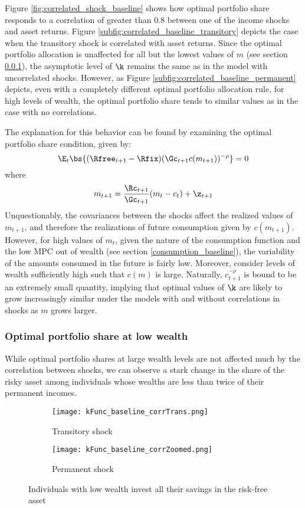 Figure \ref{fig:correlated_shock_baseline} shows how optimal portfolio share responds to a correlation of greater than 0.8 between one of the income shocks and asset returns. Figure \ref{subfig:correlated_baseline_transitory} depicts the case when the transitory shock is correlated with asset returns. Since the optimal portfolio allocation is unaffected for all but the lowest values of $m$ (see section \ref{portfolio_low_wealth}), the asymptotic level of $\k$ remains the same as in the model with uncorrelated shocks. However, as Figure \ref{subfig:correlated_baseline_permanent} depicts, even with a completely different optimal portfolio allocation rule, for high levels of wealth, the optimal portfolio share tends to similar values as in the case with no correlations.

The explanation for this behavior can be found by examining the optimal portfolio share condition, given by:
\[
\E_{t}\bs{(\Rfree_{t+1} - \Rfix)(\Gc_{t+1}c(m_{t+1}))^{-\rho}} = 0
\]
where
\[
m_{t+1} = \frac{\Rc_{t+1}}{\Gc_{t+1}}(m_{t} - c_{t}) + \z_{t+1}
\]
Unquestionably, the covariances between the shocks affect the realized values of $m_{t+1}$, and therefore the realizations of future consumption given by $c(m_{t+1})$. However, for high values of $m_{t}$, given the nature of the consumption function and the low MPC out of wealth (see section \ref{consumption_baseline}), the variability of the amounts consumed in the future is fairly low. Moreover, consider levels of wealth sufficiently high such that $c(m)$ is large. Naturally, $c_{t+1}^{-\rho}$ is bound to be an extremely small quantity, implying that optimal values of $\k$ are likely to grow increasingly similar under the models with and without correlations in shocks as $m$ grows larger.

\subsubsection{Optimal portfolio share at low wealth}\label{portfolio_low_wealth}

While optimal portfolio shares at large wealth levels are not affected much by the correlation between shocks, we can observe a stark change in the share of the risky asset among individuals whose wealths are less than twice of their permanent incomes.

\begin{figure}[h]
    \centering
    \begin{subfigure}{0.49\textwidth}
        \centering
        \texttt{[image: kFunc\_baseline\_corrTrans.png]}
        \caption{Transitory shock}
        \label{subfig:correlated_poor_transitory}        
    \end{subfigure}
    \begin{subfigure}{0.49\textwidth}
        \centering
        \texttt{[image: kFunc\_baseline\_corrZoomed.png]}
        \caption{Permanent shock}
        \label{subfig:correlated_poor_permanent}
    \end{subfigure}
    \caption{Individuals with low wealth invest all their savings in the risk-free asset}
    \label{fig:baseline_correlated_poor}
\end{figure}

